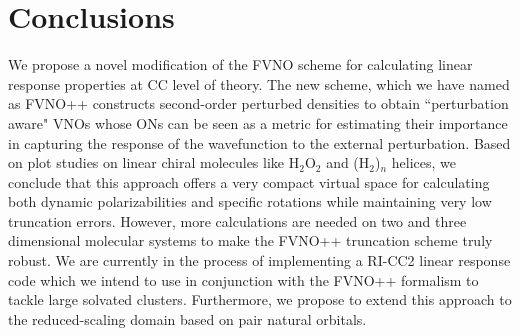 \section{Conclusions}
We propose a novel modification of the FVNO scheme for calculating linear
response properties at CC level of theory. The new scheme, which we have named
as FVNO++ constructs second-order perturbed densities to obtain ``perturbation
aware" VNOs whose ONs can be seen as a metric for estimating 
their importance in capturing the response of the wavefunction to the external 
perturbation. Based on plot studies on linear chiral molecules like H$_2$O$_2$ 
and (H$_2$)$_n$ helices, we conclude that this approach offers a very compact 
virtual space for calculating both dynamic polarizabilities and specific rotations
while maintaining very low truncation errors. However, more calculations are 
needed on two and three dimensional molecular systems to make the FVNO++ truncation 
scheme truly robust. We are currently in the process of implementing a RI-CC2 linear 
response code\cite{Friese12} which we intend to use in conjunction with the FVNO++ formalism 
to tackle large solvated clusters. Furthermore, we propose to extend this approach 
to the reduced-scaling domain based on pair natural orbitals\cite{Neese09,NeeseCCSD09}.

